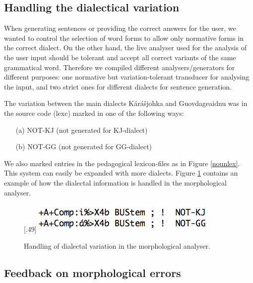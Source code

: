 \documentclass[11pt]{article}
\begin{document}
\subsection{Handling the dialectical variation}\label{dialect}


When generating sentences or providing the correct answers for the user, we wanted to control the selection of word forms to allow only normative forms in the correct dialect. On the other hand, the live analyser used for the analysis of the user input should be tolerant  and accept all correct variants of the same grammatical word. Therefore we compiled different analysers/generators for different purposes: one normative but variation-tolerant transducer for analysing the input, and two strict ones for different dialects for sentence generation.

The variation between the main dialects Kárášjohka and Guovdageaidnu was in the source code (lexc) marked in one of the following ways:
\begin{itemize}
\item[(a)] NOT-KJ (not generated for KJ-dialect) 
\item[(b)] NOT-GG (not generated for GG-dialect)  
\end{itemize}

We also marked entries in the pedagogical lexicon-files as in Figure \ref{nounlex}. This system can easily be expanded with more dialects. Figure \ref{smelex} contains an example of how the dialectal information is handled in the morphological analyser. 

\begin{figure}[htbp]
\begin{center}
\scalebox{.49}[.49]{\includegraphics{presentation/img/smelex3.png}}\\
\caption{Handling of dialectal variation in the morphological analyser.}
\label{smelex}
\end{center}
\end{figure}

\subsection{Feedback on morphological errors}\label{mfeedback}
\end{document}
